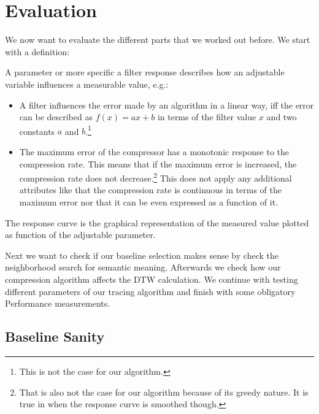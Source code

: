 \chapter{Evaluation}
\label{ch:evaluation}

We now want to evaluate the different parts that we worked out before. We start with a definition:

\begin{definition}
    A parameter or more specific a filter response describes how an adjustable variable influences a measurable value, e.g.:

    \begin{itemize}
        \item A filter influences the error made by an algorithm in a linear way, iff the error can be described as $f(x) = ax + b$ in terms of the filter value $x$ and two constants $a$ and $b$.\footnote{This is not the case for our algorithm.}
        \item The maximum error of the compressor has a monotonic response to the compression rate. This means that if the maximum error is increased, the compression rate does not decrease.\footnote{That is also not the case for our algorithm because of its greedy nature. It is true in when the response curve is smoothed though.} This does not apply any additional attributes like that the compression rate is continuous in terms of the maximum error nor that it can be even expressed as a function of it.
    \end{itemize}

    The response curve is the graphical representation of the measured value plotted as function of the adjustable parameter.
\end{definition}

Next we want to check if our baseline selection makes sense by check the neighborhood search for semantic meaning. Afterwards we check how our compression algorithm affects the DTW calculation. We continue with testing different parameters of our tracing algorithm and finish with some obligatory Performance measurements.



\section{Baseline Sanity}
\label{sec:evaluation:baseline}


